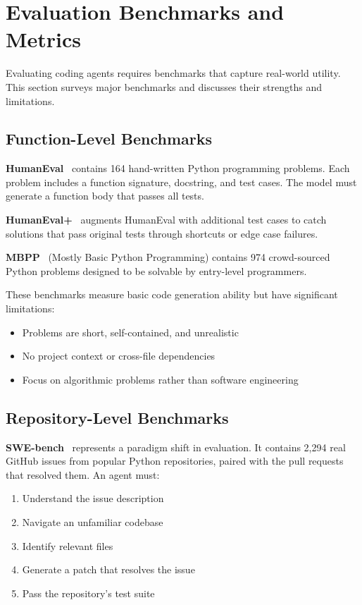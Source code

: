 \section{Evaluation Benchmarks and Metrics}
\label{sec:benchmarks}

Evaluating coding agents requires benchmarks that capture real-world utility. This section surveys major benchmarks and discusses their strengths and limitations.

\subsection{Function-Level Benchmarks}

\textbf{HumanEval}~\citep{chen2021codex} contains 164 hand-written Python programming problems. Each problem includes a function signature, docstring, and test cases. The model must generate a function body that passes all tests.

\textbf{HumanEval+}~\citep{liu2023humaneval} augments HumanEval with additional test cases to catch solutions that pass original tests through shortcuts or edge case failures.

\textbf{MBPP}~\citep{austin2021mbpp} (Mostly Basic Python Programming) contains 974 crowd-sourced Python problems designed to be solvable by entry-level programmers.

These benchmarks measure basic code generation ability but have significant limitations:
\begin{itemize}
    \item Problems are short, self-contained, and unrealistic
    \item No project context or cross-file dependencies
    \item Focus on algorithmic problems rather than software engineering
\end{itemize}

\subsection{Repository-Level Benchmarks}

\textbf{SWE-bench}~\citep{jimenez2024swebench} represents a paradigm shift in evaluation. It contains 2,294 real GitHub issues from popular Python repositories, paired with the pull requests that resolved them. An agent must:
\begin{enumerate}
    \item Understand the issue description
    \item Navigate an unfamiliar codebase
    \item Identify relevant files
    \item Generate a patch that resolves the issue
    \item Pass the repository's test suite
\end{enumerate}


